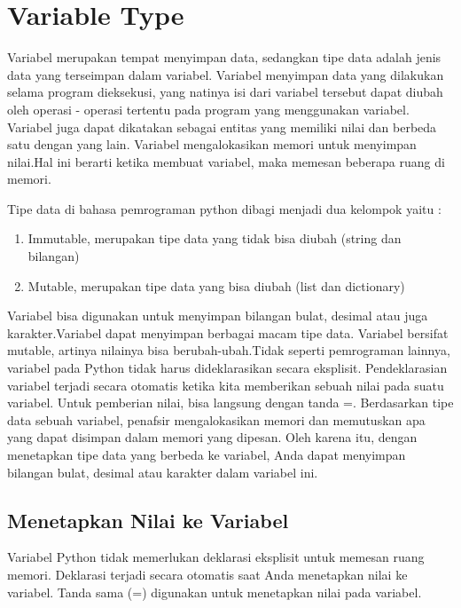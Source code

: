 \section{Variable Type}
Variabel merupakan tempat menyimpan data, sedangkan tipe data adalah jenis data yang terseimpan dalam variabel. Variabel menyimpan data yang dilakukan selama program dieksekusi, yang natinya isi dari variabel tersebut dapat diubah oleh operasi - operasi tertentu pada program yang menggunakan variabel. Variabel juga dapat dikatakan sebagai entitas yang memiliki nilai dan berbeda satu dengan yang lain. Variabel mengalokasikan memori untuk menyimpan nilai.Hal ini berarti ketika membuat variabel, maka  memesan beberapa ruang di memori. 

Tipe data di bahasa pemrograman python dibagi menjadi dua kelompok yaitu :
\begin{enumerate}
	\item Immutable, merupakan tipe data yang tidak bisa diubah (string dan bilangan)
	\item Mutable, merupakan tipe data yang bisa diubah (list dan dictionary)
\end{enumerate}  

Variabel bisa digunakan untuk menyimpan bilangan bulat, desimal atau juga karakter.Variabel dapat menyimpan berbagai macam tipe data. Variabel bersifat mutable, artinya nilainya bisa berubah-ubah.Tidak seperti pemrograman lainnya, variabel pada Python tidak harus dideklarasikan secara eksplisit. Pendeklarasian variabel terjadi secara otomatis ketika kita memberikan sebuah nilai pada suatu variabel. Untuk pemberian nilai, bisa langsung dengan tanda =. Berdasarkan tipe data sebuah variabel, penafsir mengalokasikan memori dan memutuskan apa yang dapat disimpan dalam memori yang dipesan. Oleh karena itu, dengan menetapkan tipe data yang berbeda ke variabel, Anda dapat menyimpan bilangan bulat, desimal atau karakter dalam variabel ini.

\subsection{Menetapkan Nilai ke Variabel}
Variabel Python tidak memerlukan deklarasi eksplisit untuk memesan ruang memori. Deklarasi terjadi secara otomatis saat Anda menetapkan nilai ke variabel. Tanda sama (=) digunakan untuk menetapkan nilai pada variabel.

